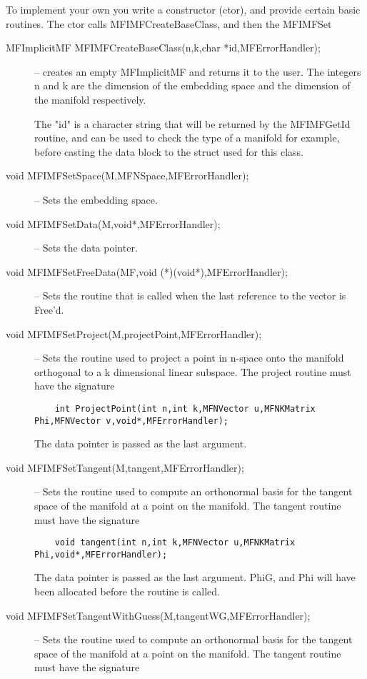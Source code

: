\documentclass[12pt]{article}
\begin{document}
    To implement your own you write a constructor (ctor), and provide certain basic routines. 
    The ctor calls {MFIMFCreateBaseClass}, and then the {MFIMFSet} 

\begin{description}
\item [MFImplicitMF MFIMFCreateBaseClass(n,k,char *id,MFErrorHandler);]
-- creates an empty MFImplicitMF and returns it to the user. The integers n and k are the 
dimension of the embedding space and the dimension of the manifold respectively.

 The "id" is a character string
 that will be returned by the {MFIMFGetId} routine, and can be used to check the type
 of a manifold for example, before casting the data block to the struct used for this class.
\item [void MFIMFSetSpace(M,MFNSpace,MFErrorHandler);]
-- Sets the embedding space.
\item [void MFIMFSetData(M,void*,MFErrorHandler);]
-- Sets the data pointer.
\item [void MFIMFSetFreeData(MF,void (*)(void*),MFErrorHandler);]
 -- Sets the routine that is called when the last reference to the vector is Free'd.
\item [void MFIMFSetProject(M,projectPoint,MFErrorHandler);]
-- Sets the routine used to project a point in n-space onto the manifold orthogonal to a k dimensional
linear subspace. The project routine must have the signature
\begin{verbatim}
    int ProjectPoint(int n,int k,MFNVector u,MFNKMatrix Phi,MFNVector v,void*,MFErrorHandler);
\end{verbatim}
The data pointer is passed as the last argument.
\item [void MFIMFSetTangent(M,tangent,MFErrorHandler);]
-- Sets the routine used to compute an orthonormal basis for the tangent space of the manifold at
a point on the manifold.
The tangent routine must have the signature
\begin{verbatim}
    void tangent(int n,int k,MFNVector u,MFNKMatrix Phi,void*,MFErrorHandler);
\end{verbatim}
The data pointer is passed as the last argument. PhiG, and Phi will have been 
allocated before the routine is called.
\item [void MFIMFSetTangentWithGuess(M,tangentWG,MFErrorHandler);]
-- Sets the routine used to compute an orthonormal basis for the tangent space of the manifold at
a point on the manifold.
The tangent routine must have the signature

\end{description}
\end{document}
